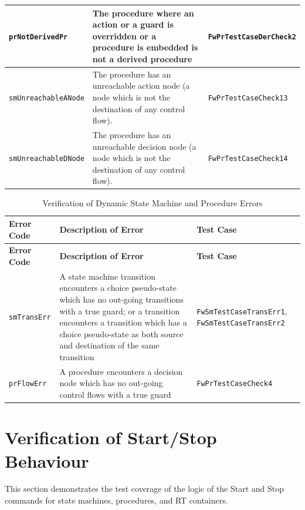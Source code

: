 \documentclass[requirements]{../fwprofile}
\begin{document}
\begin{longtable}{|p{3cm}|p{3.7cm}|p{4.5cm}|}
\hline
\texttt{prNotDerivedPr} & The procedure where an action or a guard is overridden or a procedure is embedded is not a derived procedure
& \texttt{FwPrTestCaseDerCheck2} \\
\hline
\texttt{smUnreachableANode} & The procedure has an unreachable action node (a node which is not the destination of any control flow). 
& \texttt{FwPrTestCaseCheck13} \\
\hline
\texttt{smUnreachableDNode} & The procedure has an unreachable decision node (a node which is not the destination of any control flow). 
& \texttt{FwPrTestCaseCheck14} \\
\hline
\end{longtable}


\begin{longtable}{|p{3cm}|p{4.2cm}|p{4cm}|}
\caption{Verification of Dynamic State Machine and Procedure Errors}\label{tab:Dyn_Error} \\
\hline
\rowcolor{gray}
\textbf{Error Code} & \textbf{Description of Error} & \textbf{Test Case} \\
\hline
\endfirsthead
\rowcolor{gray}
\textbf{Error Code} & \textbf{Description of Error} & \textbf{Test Case} \\
\hline
\endhead
\texttt{smTransErr} & A state machine transition encounters a choice pseudo-state 
which has no out-going transitions 
with a true guard; or a transition encounters a transition which has a choice pseudo-state 
as both source and destination of the same transition & \texttt{FwSmTestCaseTransErr1}, 
\texttt{FwSmTestCaseTransErr2} \\
\hline
\texttt{prFlowErr} & A procedure encounters a decision node which has no out-going 
control flows with a true guard & \texttt{FwPrTestCaseCheck4} \\
\hline
\end{longtable}

\section{Verification of Start/Stop Behaviour}
This section demonstrates the test coverage of the logic of the Start and Stop commands 
for state machines, procedures, and RT containers.
\end{document}
